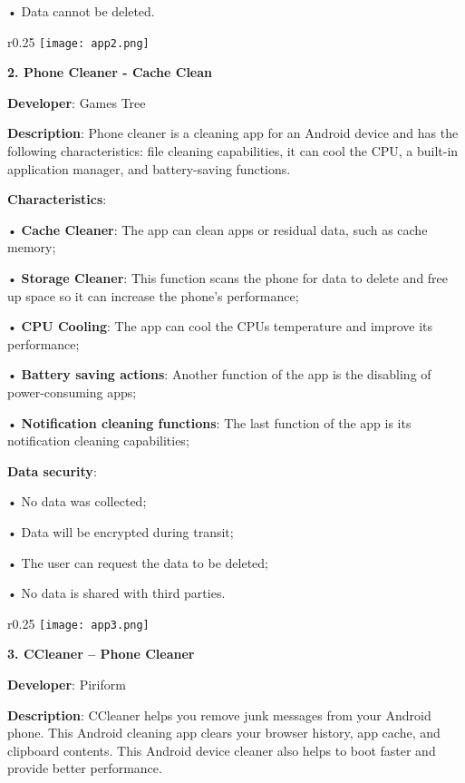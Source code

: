• Data cannot be deleted.\newline

\begin{wrapfigure}{r}{0.25\textwidth} 
    \centering
    \texttt{[image: app2.png]}
\end{wrapfigure}

\noindent 
\textbf{2. Phone Cleaner - Cache Clean}

\textbf{Developer}: Games Tree

\textbf{Description}: Phone cleaner is a cleaning app for an Android device and has the following characteristics: file cleaning capabilities, it can cool the CPU, a built-in application manager, and battery-saving functions.

\textbf{Characteristics}:

• \textbf{Cache Cleaner}: The app can clean apps or residual data, such as cache memory;

• \textbf{Storage Cleaner}: This function scans the phone for data to delete and free up space so it can increase the phone's performance;

• \textbf{CPU Cooling}: The app can cool the CPUs temperature and improve its performance;

• \textbf{Battery saving actions}: Another function of the app is the disabling of power-consuming apps;

• \textbf{Notification cleaning functions}: The last function of the app is its notification cleaning capabilities;

\textbf{Data security}:

• No data was collected;

• Data will be encrypted during transit;

• The user can request the data to be deleted;

• No data is shared with third parties.\newline

\begin{wrapfigure}{r}{0.25\textwidth} 
    \centering
    \texttt{[image: app3.png]}
\end{wrapfigure}

\noindent 
\textbf{3. CCleaner – Phone Cleaner }

\textbf{Developer}: Piriform

\textbf{Description}: CCleaner helps you remove junk messages from your Android phone. This Android cleaning app clears your browser history, app cache, and clipboard contents. This Android device cleaner also helps to boot faster and provide better performance.

